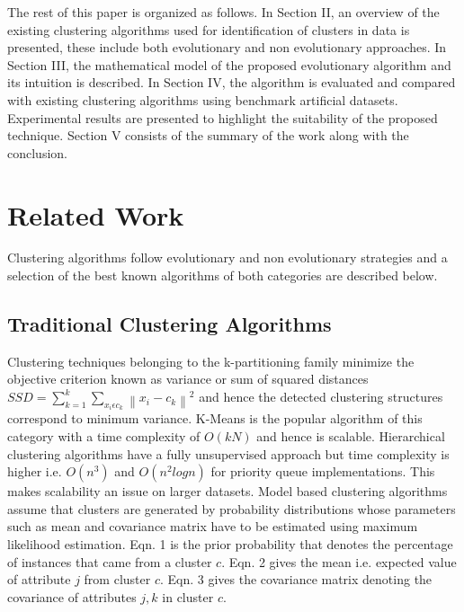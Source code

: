 \documentclass[conference]{IEEEtran}
\begin{document}
The rest of this paper is organized as follows. In Section II, an overview of the existing clustering algorithms used
for identification of clusters in data is presented, these include both evolutionary and non evolutionary approaches. In Section III, the mathematical model of the proposed evolutionary algorithm and its intuition is described. In Section IV, the algorithm is evaluated and compared with existing clustering algorithms using benchmark artificial datasets. Experimental results are presented to highlight the suitability of the proposed technique. Section V consists of the summary of the work along with the conclusion. \\
      

\section{Related Work}
Clustering algorithms follow evolutionary and non evolutionary strategies and a selection of the best known algorithms \cite{ma} of both categories are described below.\\
\subsection{Traditional Clustering Algorithms}

Clustering techniques belonging to the k-partitioning family minimize the objective criterion known as variance or sum of squared distances $SSD = \sum_{k=1}^{k} \sum_{x_i \epsilon c_k} \left \| x_i - c_k \right \| ^2$ and hence the detected clustering structures correspond to minimum variance. K-Means is the popular algorithm of this category with a time complexity of $O(kN)$ and hence is scalable. Hierarchical clustering algorithms have a fully unsupervised approach but time complexity is     higher i.e. $O(n^3)$ and $O(n^2 log n)$ for priority queue implementations. This makes scalability an issue on larger datasets. Model based clustering algorithms assume that clusters are generated by probability distributions whose parameters such as mean and covariance matrix have to be estimated using maximum likelihood estimation. Eqn. 1 is the prior probability that denotes the percentage of instances that came from a cluster $c$. Eqn. 2 gives the mean i.e. expected value of attribute $j$ from cluster $c$. Eqn. 3 gives the covariance matrix denoting the covariance of attributes $j,k$ in cluster $c$.
\end{document}
